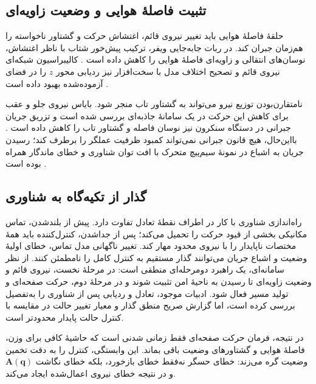 \subsection{تثبیت فاصلهٔ هوایی و وضعیت زاویه‌ای}
\label{subsec:airgap-attitude-stabilization}

حلقهٔ فاصلهٔ هوایی باید تغییر نیروی قائم، اغتشاش حرکت و گشتاور ناخواسته را هم‌زمان جبران کند. در ربات جابه‌جایی ویفر، ترکیب پیش‌خور شتاب با ناظر اغتشاش، نوسان‌های انتقالی و زاویه‌ای فاصلهٔ هوایی را کاهش داده است \cite{haRobustAirgapStabilization2026}. کالیبراسیون شبکه‌ای نیروی قائم و تصحیح اختلاف مدل  با سخت‌افزار نیز ردیابی محور $z$ را در فضای آزموده‌شده بهبود داده است \cite{nakataCompensationFEMBased2026}.

نامتقارن‌بودن توزیع نیرو می‌تواند به گشتاور تاب منجر شود. بایاس نیروی جلو و عقب برای کاهش این حرکت در یک سامانهٔ جاذبه‌ای بررسی شده است \cite{mitsuiStudyPitchingSuppression2024} و تزریق جریان جبرانی در دستگاه سنکرون نیز نوسان فاصله و گشتاور تاب را کاهش داده است \cite{wangMagneticLevitationControl2024}. بااین‌حال، هیچ قانون جبرانی نمی‌تواند کمبود ظرفیت عملگر را برطرف کند؛ رسیدن جریان به اشباع در نمونهٔ سیم‌پیچ متحرک با افت توان شناوری و خطای ماندگار همراه بوده است \cite{nakataDriveStabilizationMultidegreeoffreedom2025}.

\subsection{گذار از تکیه‌گاه به شناوری}
\label{subsec:levitation-propulsion-stability}

راه‌اندازی شناوری با کار در اطراف نقطهٔ تعادل تفاوت دارد. پیش از بلندشدن، تماس مکانیکی بخشی از قیود حرکت را تحمیل می‌کند؛ پس از جداشدن، کنترل‌کننده باید همهٔ مختصات ناپایدار را با نیروی محدود مهار کند. تغییر ناگهانی مدل تماس، خطای اولیهٔ وضعیت و اشباع جریان می‌توانند گذار مستقیم به کنترل کامل را نامطمئن کنند. از نظر سامانه‌ای، یک راهبرد دومرحله‌ای منطقی است: در مرحلهٔ نخست، نیروی قائم و وضعیت زاویه‌ای تا رسیدن به ناحیهٔ امن تثبیت شوند و در مرحلهٔ دوم، حرکت صفحه‌ای و تولید مسیر فعال شود. ادبیات موجود، تعادل و ردیابی پس از شناوری را به‌تفصیل بررسی کرده است، اما گزارش صریح منطق گذار و معیار تغییر حالت در مقایسه با کنترل حالت پایدار محدودتر است.

\label{subsec:stability-summary}
در نتیجه، فرمان حرکت صفحه‌ای فقط زمانی شدنی است که حاشیهٔ کافی برای وزن، فاصلهٔ هوایی و گشتاورهای وضعیت باقی بماند. این وابستگی، کنترل را به دقت تخمین وضعیت گره می‌زند: خطای حسگر نه‌فقط خطای بازخورد، بلکه خطای نگاشت $\mathbf{A}(\mathbf{q})$ و در نتیجه خطای نیروی اعمال‌شده ایجاد می‌کند.


